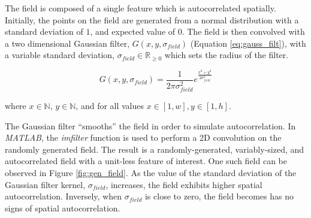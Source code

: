 The field is composed of a single feature which is autocorrelated spatially. Initially, the points on the field are generated from a normal distribution with a standard deviation of $1$, and expected value of $0$. The field is then convolved with a two dimensional Gaussian filter, $G(x,y,\sigma_{field})$ (Equation \ref{eq:gauss_filt}), with a variable standard deviation, $\sigma_{field} \in \mathbb{R}_{\geq 0}$ which sets the radius of the filter. 

\begin{equation}
G(x,y,\sigma_{field}) = \frac{1}{2 \pi \sigma_{field}^2} e^{\frac{x^2 + y^2}{2\sigma_{field}^2}}
\label{eq:gauss_filt}
\end{equation}

\noindent where $x \in \mathbb{N}$, $y \in \mathbb{N}$, and for all values $x \in [1, w], y \in [1, h]$.

The Gaussian filter ``smooths'' the field in order to simulate autocorrelation. In \textit{MATLAB}, the \textit{imfilter} function is used to perform a 2D convolution on the randomly generated field. The result is a randomly-generated, variably-sized, and autocorrelated field with a unit-less feature of interest. One such field can be observed in Figure \ref{fig:gen_field}. As the value of the standard deviation of the Gaussian filter kernel, $\sigma_{field}$, increases, the field exhibits higher spatial autocorrelation. Inversely, when $\sigma_{field}$ is close to zero, the field becomes has no signs of spatial autocorrelation.


